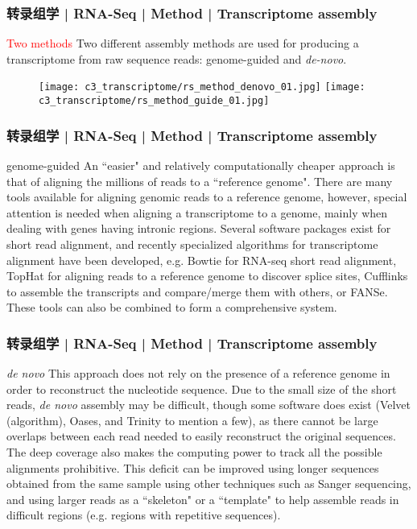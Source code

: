 \begin{frame}
  \frametitle{转录组学 | RNA-Seq | Method | Transcriptome assembly}
  \begin{block}{\textcolor{red}{Two methods}}
    Two different assembly methods are used for producing a transcriptome from raw sequence reads: genome-guided and \textit{de-novo}. 
  \end{block}
  \begin{figure}
    \centering
    \texttt{[image: c3\_transcriptome/rs\_method\_denovo\_01.jpg]} \quad
    \texttt{[image: c3\_transcriptome/rs\_method\_guide\_01.jpg]}
  \end{figure}
\end{frame}

\begin{frame}
  \frametitle{转录组学 | RNA-Seq | Method | Transcriptome assembly}
  \begin{block}{genome-guided}
    An ``easier" and relatively computationally cheaper approach is that of aligning the millions of reads to a ``reference genome". There are many tools available for aligning genomic reads to a reference genome, however, special attention is needed when aligning a transcriptome to a genome, mainly when dealing with genes having intronic regions. Several software packages exist for short read alignment, and recently specialized algorithms for transcriptome alignment have been developed, e.g. Bowtie for RNA-seq short read alignment, TopHat for aligning reads to a reference genome to discover splice sites, Cufflinks to assemble the transcripts and compare/merge them with others, or FANSe. These tools can also be combined to form a comprehensive system.
  \end{block}
\end{frame}

\begin{frame}
  \frametitle{转录组学 | RNA-Seq | Method | Transcriptome assembly}
  \begin{block}{\textit{de novo}}
    This approach does not rely on the presence of a reference genome in order to reconstruct the nucleotide sequence. Due to the small size of the short reads, \textit{de novo} assembly may be difficult, though some software does exist (Velvet (algorithm), Oases, and Trinity to mention a few), as there cannot be large overlaps between each read needed to easily reconstruct the original sequences. The deep coverage also makes the computing power to track all the possible alignments prohibitive. This deficit can be improved using longer sequences obtained from the same sample using other techniques such as Sanger sequencing, and using larger reads as a ``skeleton" or a ``template" to help assemble reads in difficult regions (e.g. regions with repetitive sequences).
  \end{block}
\end{frame}

